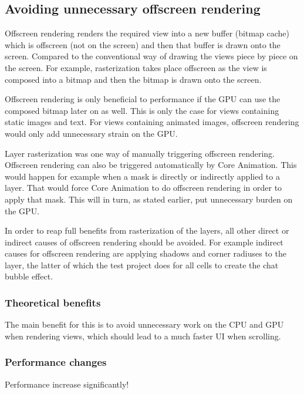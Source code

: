 \documentclass[a4paper,12pt]{article}
\begin{document}
\subsection{Avoiding unnecessary offscreen rendering}
Offscreen rendering renders the required view into a new buffer (bitmap cache) which is offscreen (not on the screen) and then that buffer is drawn onto the screen. Compared to the conventional way of drawing the views piece by piece on the screen. For example, rasterization takes place offscreen as the view is composed into a bitmap and then the bitmap is drawn onto the screen.

Offscreen rendering is only beneficial to performance if the GPU can use the composed bitmap later on as well. This is only the case for  views containing static images and text. For views containing animated images, offscreen rendering would only add unnecessary strain on the GPU.

Layer rasterization was one way of manually triggering offscreen rendering. Offscreen rendering can also be triggered automatically by Core Animation. This would happen for example when a mask is directly or indirectly applied to a layer. That would force Core Animation to do offscreen rendering in order to apply that mask. This will in turn, as stated earlier, put unnecessary burden on the GPU.\cite{MovingPixelsOntoTheScreen}

In order to reap full benefits from rasterization of the layers, all other direct or indirect causes of offscreen rendering should be avoided. For example indirect causes for offscreen rendering are applying shadows and corner radiuses to the layer, the latter of which the test project does for all cells to create the chat bubble effect.\cite{MovingPixelsOntoTheScreen}

\subsubsection*{Theoretical benefits}
The main benefit for this is to avoid unnecessary work on the CPU and GPU when rendering views, which should lead to a much faster UI when scrolling. 

\subsubsection*{Performance changes}
Performance increase significantly!
\end{document}

